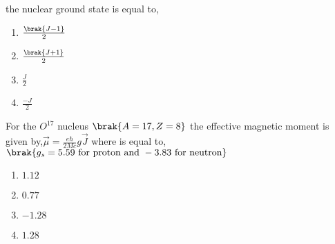 the nuclear ground state is equal to, 
\begin{multicols}{4}
    \begin{enumerate}
        \item $\frac{\brak{J-1}}{2}$
        \item $\frac{\brak{J+1}}{2}$
        \item $\frac{J}{2}$
        \item $\frac{-J}{2}$
    \end{enumerate}
\end{multicols}
\bigskip
\item For the $O^{17}$ nucleus $\brak{A=17,Z=8}$ the effective magnetic moment is given by,$\overrightarrow{\mu}=\frac{e\hbar}{2Mc} g\overrightarrow{J}$ where is equal to,$\brak{g_{s} = 5.59 \text{ for proton and } -3.83 \text{ for neutron}}$
\begin{multicols}{4}
    \begin{enumerate}
        \item $1.12$
        \item $0.77$
        \item $-1.28$
        \item $1.28$
    \end{enumerate}
\end{multicols}






